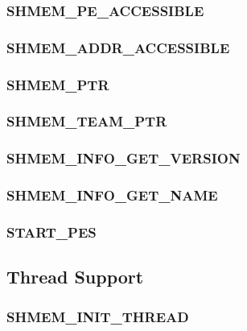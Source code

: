 \documentclass[10pt,oneside]{book}
\begin{document}
\subsubsection{\textbf{SHMEM\_PE\_ACCESSIBLE}}\label{subsec:shmem_pe_accessible}


\subsubsection{\textbf{SHMEM\_ADDR\_ACCESSIBLE}}\label{subsec:shmem_addr_accessible}


\subsubsection{\textbf{SHMEM\_PTR}}\label{subsec:shmem_ptr}


\subsubsection{\textbf{SHMEM\_TEAM\_PTR}}\label{subsec:shmem_team_ptr}


\subsubsection{\textbf{SHMEM\_INFO\_GET\_VERSION}}\label{subsec:shmem_info_get_version}


\subsubsection{\textbf{SHMEM\_INFO\_GET\_NAME}}\label{subsec:shmem_info_get_name}


\subsubsection{\textbf{START\_PES}}\label{subsec:start_pes}


\subsection{Thread Support}
\label{subsec:thread_support}


\subsubsection{\textbf{SHMEM\_INIT\_THREAD}}
\label{subsec:shmem_init_thread}

\end{document}
